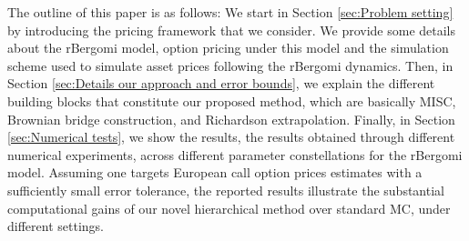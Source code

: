 The outline of this paper is as follows: We start in Section \ref{sec:Problem setting} by  introducing  the pricing framework that we consider. We provide some details about the rBergomi model, option pricing under this model and the simulation scheme used to simulate asset prices following the rBergomi dynamics. Then, in Section \ref{sec:Details our approach and error bounds}, we explain the different building blocks that constitute our proposed method, which are basically MISC, Brownian bridge construction, and Richardson extrapolation. Finally, in Section \ref{sec:Numerical tests}, we show the results, the results obtained through different numerical experiments, across different parameter constellations for the rBergomi model. Assuming one targets European call option prices estimates with a sufficiently small error tolerance, the reported results   illustrate the substantial computational gains of our novel hierarchical method over standard MC, under different settings. 



